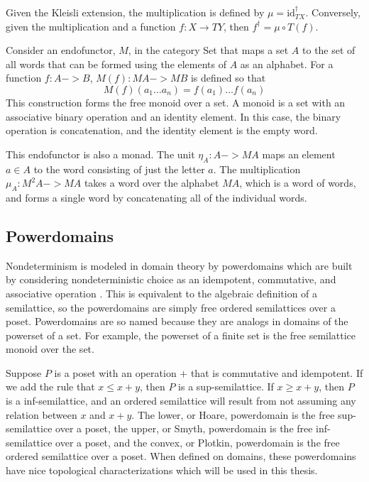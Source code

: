 Given the Kleisli extension, the multiplication is defined by $\mu = \mathrm{id}_{TX}^\dagger$.  Conversely, given the multiplication and a function $f:X\rightarrow TY$, then $f^\dagger = \mu \circ T(f)$.

\begin{example}
Consider an endofunctor, $M$, in the category \textsf{Set} that maps a set $A$ to the set of all words that can be formed using the elements of $A$ as an alphabet.  For a function $f:A->B$, $M(f):MA->MB$ is defined so that
\[M(f)(a_1\ldots a_n) = f(a_1)\ldots f(a_n)\]
This construction forms the free monoid over a set.  A monoid is a set with an associative binary operation and an identity element.  In this case, the binary operation is concatenation, and the identity element is the empty word.

This endofunctor is also a monad.  The unit $\eta_A:A->MA$ maps an element $a\in A$ to the word consisting of just the letter $a$. The multiplication $\mu_A:M^2 A->MA$ takes a word over the alphabet $MA$, which is a word of words, and forms a single word by concatenating all of the individual words.
\end{example}

\subsection{Powerdomains}\label{powerdomains}

Nondeterminism is modeled in domain theory by powerdomains which are built by considering nondeterministic choice as an idempotent, commutative, and associative operation \cite{mislove1998topology}.  This is equivalent to the algebraic definition of a semilattice, so the powerdomains are simply free ordered semilattices over a poset.  Powerdomains are so named because they are analogs in domains of the powerset of a set.  For example, the powerset of a finite set is the free semilattice monoid over the set.

Suppose $P$ is a poset with an operation $+$ that is commutative and  idempotent.  If we add the rule that $x\leq x+y$, then $P$ is a sup-semilattice.  If $x\geq x+y$, then $P$ is a inf-semilattice, and an ordered semilattice will result from not assuming any relation between $x$ and $x+y$.  The lower, or Hoare, powerdomain is the free sup-semilattice over a poset, the upper, or Smyth, powerdomain is the free inf-semilattice over a poset, and the convex, or Plotkin, powerdomain is the free ordered semilattice over a poset.  When defined on domains, these powerdomains have nice topological characterizations which will be used in this thesis.


